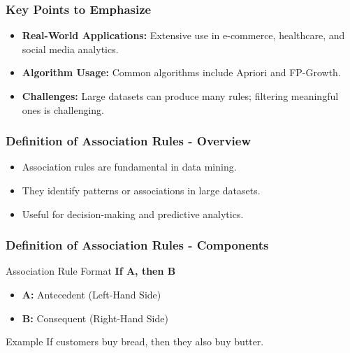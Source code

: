 \documentclass{beamer}
\begin{document}
\begin{frame}[fragile]
    \frametitle{Key Points to Emphasize}
    \begin{itemize}
        \item \textbf{Real-World Applications:} Extensive use in e-commerce, healthcare, and social media analytics.
        \item \textbf{Algorithm Usage:} Common algorithms include Apriori and FP-Growth.
        \item \textbf{Challenges:} Large datasets can produce many rules; filtering meaningful ones is challenging.
    \end{itemize}
\end{frame}

\begin{frame}[fragile]
    \frametitle{Definition of Association Rules - Overview}
    \begin{itemize}
        \item Association rules are fundamental in data mining.
        \item They identify patterns or associations in large datasets.
        \item Useful for decision-making and predictive analytics.
    \end{itemize}
\end{frame}

\begin{frame}[fragile]
    \frametitle{Definition of Association Rules - Components}
    \begin{block}{Association Rule Format}
        \textbf{If A, then B}
    \end{block}
    \begin{itemize}
        \item \textbf{A:} Antecedent (Left-Hand Side)
        \item \textbf{B:} Consequent (Right-Hand Side)
    \end{itemize}
    \begin{exampleblock}{Example}
        If customers buy bread, then they also buy butter.
    \end{exampleblock}
\end{frame}
\end{document}
